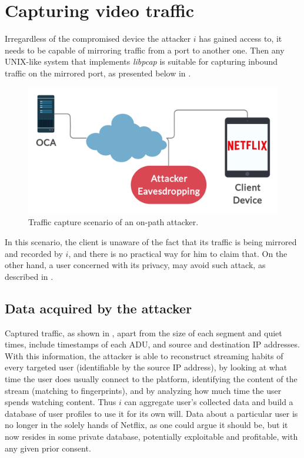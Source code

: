 \newpage
\section{Capturing video traffic}

Irregardless of the compromised device the attacker $i$ has gained access to,
it needs to be capable of mirroring traffic from a port to another one. Then
any UNIX-like system that implements \emph{libpcap} is suitable for capturing
inbound traffic on the mirrored port, as presented below in .

\begin{figure}[!htb]
  \centering
  \includegraphics[width=\columnwidth]{img/schema.png}
  \caption{Traffic capture scenario of an on-path attacker.}
  \label{fig:schema}
\end{figure}

In this scenario, the client is unaware of the fact that its traffic is being
mirrored and recorded by $i$, and there is no practical way for him to
claim that. On the other hand, a user concerned with its privacy, may avoid
such attack, as described in .

\subsection{Data acquired by the attacker}

Captured traffic, as shown in , apart from the size of each
segment and quiet times, include timestamps of each ADU, and source and
destination IP addresses. With this information, the attacker is able to
reconstruct streaming habits of every targeted user (identifiable by the source
IP address), by looking at what time the user does usually connect to the
platform, identifying the content of the stream (matching to fingerprints), and
by analyzing how much time the user spends watching content. Thus $i$ can
aggregate user's collected data and build a database of user profiles to use it
for its own will. Data about a particular user is no longer in the solely hands
of Netflix, as one could argue it should be, but it now resides in some private
database, potentially exploitable and profitable, with any given prior consent.

